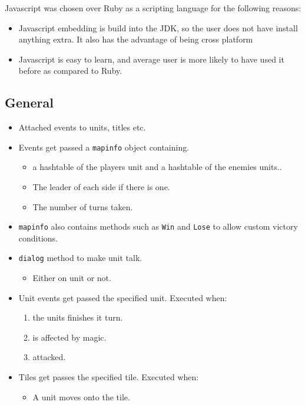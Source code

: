 \noindent Javascript was chosen over Ruby as a scripting language for the following reasons:
\begin{itemize}
	\item Javascript embedding is build into the JDK, so the user does not have install anything extra. It also has the advantage of being cross platform  
	\item Javascript is easy to learn, and average user is more likely to have used it before as compared to Ruby.
\end{itemize}



\subsection{General}

\begin{itemize}

\item Attached events to units, titles etc.

\item Events get passed a \texttt{mapinfo} object containing.
\begin{itemize}
	\item a hashtable of the players unit and a hashtable of the enemies units..
	\item The leader of each side if there is one.
	\item The number of turns taken.
\end{itemize}

\item \texttt{mapinfo} also contains methods such as \texttt{Win} and \texttt{Lose} to allow custom victory conditions.

\item \texttt{dialog} method to make unit talk.
\begin{itemize}
	\item Either on unit or not.
\end{itemize}

\item Unit events get passed the specified unit. Executed when:
\begin{enumerate}
	\item the units finishes it turn.
	\item is affected by magic.
	\item attacked.
\end{enumerate}

\item Tiles get passes the specified tile. Executed when:
\begin{itemize}
	\item A unit moves onto the tile.
\end{itemize}

\end{itemize}

